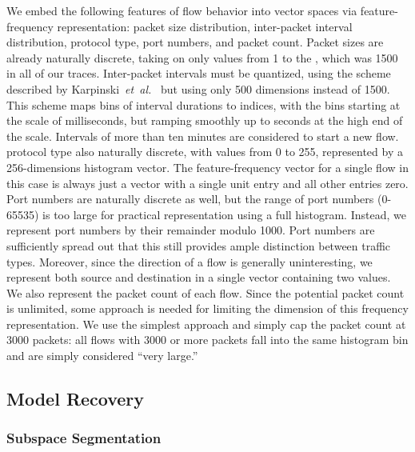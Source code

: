 \documentclass[conference]{IEEEtran}
\begin{document}
We embed the following features of flow behavior into vector spaces via feature-frequency representation:
packet size distribution,
inter-packet interval distribution,
 protocol type,
 port numbers,
and packet count.
Packet sizes are already naturally discrete, taking on only values from 1 to the , which was 1500 in all of our traces.
Inter-packet intervals must be quantized, using the scheme described by Karpinski~\emph{et~al.}~\cite{Karpinski08} but using only 500 dimensions instead of 1500.
This scheme maps bins of interval durations to indices, with the bins starting at the scale of milliseconds, but ramping smoothly up to seconds at the high end of the scale.
Intervals of more than ten minutes are considered to start a new flow.
 protocol type also naturally discrete, with values from 0 to 255, represented by a 256-dimensions histogram vector.
The feature-frequency vector for a single flow in this case is always just a vector with a single unit entry and all other entries zero.
Port numbers are naturally discrete as well, but the range of port numbers (0-65535) is too large for practical representation using a full histogram.
Instead, we represent port numbers by their remainder modulo 1000.
Port numbers are sufficiently spread out that this still provides ample distinction between traffic types.
Moreover, since the direction of a flow is generally uninteresting, we represent both source and destination in a single vector containing two values.
We also represent the packet count of each flow.
Since the potential packet count is unlimited, some approach is needed for limiting the dimension of this frequency representation.
We use the simplest approach and simply cap the packet count at 3000 packets:
all flows with 3000 or more packets fall into the same histogram bin and are simply considered ``very large.''

\subsection{Model Recovery}

\subsubsection{Subspace Segmentation}
\end{document}
